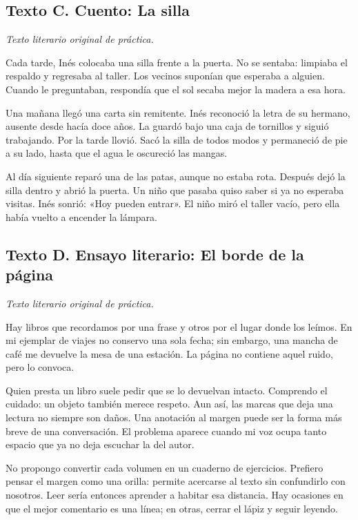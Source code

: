 \subsection*{Texto C. Cuento: La silla}
\textit{Texto literario original de práctica.}

Cada tarde, Inés colocaba una silla frente a la puerta. No se sentaba: limpiaba el respaldo y regresaba al taller. Los vecinos suponían que esperaba a alguien. Cuando le preguntaban, respondía que el sol secaba mejor la madera a esa hora.

Una mañana llegó una carta sin remitente. Inés reconoció la letra de su hermano, ausente desde hacía doce años. La guardó bajo una caja de tornillos y siguió trabajando. Por la tarde llovió. Sacó la silla de todos modos y permaneció de pie a su lado, hasta que el agua le oscureció las mangas.

Al día siguiente reparó una de las patas, aunque no estaba rota. Después dejó la silla dentro y abrió la puerta. Un niño que pasaba quiso saber si ya no esperaba visitas. Inés sonrió: «Hoy pueden entrar». El niño miró el taller vacío, pero ella había vuelto a encender la lámpara.

\subsection*{Texto D. Ensayo literario: El borde de la página}
\textit{Texto literario original de práctica.}

Hay libros que recordamos por una frase y otros por el lugar donde los leímos. En mi ejemplar de viajes no conservo una sola fecha; sin embargo, una mancha de café me devuelve la mesa de una estación. La página no contiene aquel ruido, pero lo convoca.

Quien presta un libro suele pedir que se lo devuelvan intacto. Comprendo el cuidado: un objeto también merece respeto. Aun así, las marcas que deja una lectura no siempre son daños. Una anotación al margen puede ser la forma más breve de una conversación. El problema aparece cuando mi voz ocupa tanto espacio que ya no deja escuchar la del autor.

No propongo convertir cada volumen en un cuaderno de ejercicios. Prefiero pensar el margen como una orilla: permite acercarse al texto sin confundirlo con nosotros. Leer sería entonces aprender a habitar esa distancia. Hay ocasiones en que el mejor comentario es una línea; en otras, cerrar el lápiz y seguir leyendo.
